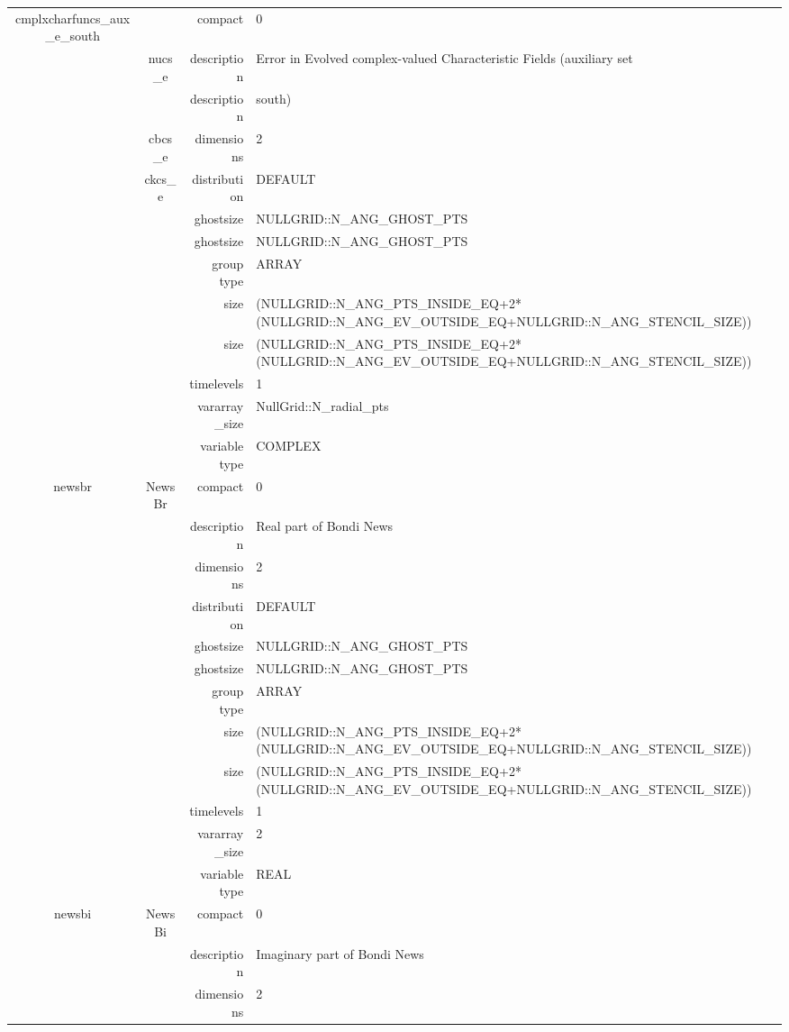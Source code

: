\begin{tabular*}{150mm}{|c|c@{\extracolsep{\fill}}|rl|}
\hline 
cmplxcharfuncs\_aux\_e\_south &  & compact & 0 \\ 
 & nucs\_e & description & Error in Evolved complex-valued Characteristic Fields (auxiliary set \\ 
& ~ & description &  south) \\ 
 & cbcs\_e & dimensions & 2 \\ 
 & ckcs\_e & distribution & DEFAULT \\ 
 &  & ghostsize & NULLGRID::N\_ANG\_GHOST\_PTS \\ 
& ~ & ghostsize & NULLGRID::N\_ANG\_GHOST\_PTS \\ 
 &  & group type & ARRAY \\ 
 &  & size & (NULLGRID::N\_ANG\_PTS\_INSIDE\_EQ+2*(NULLGRID::N\_ANG\_EV\_OUTSIDE\_EQ+NULLGRID::N\_ANG\_STENCIL\_SIZE)) \\ 
& ~ & size & (NULLGRID::N\_ANG\_PTS\_INSIDE\_EQ+2*(NULLGRID::N\_ANG\_EV\_OUTSIDE\_EQ+NULLGRID::N\_ANG\_STENCIL\_SIZE)) \\ 
 &  & timelevels & 1 \\ 
 &  & vararray\_size & NullGrid::N\_radial\_pts \\ 
 &  & variable type & COMPLEX \\ 
\hline 
newsbr & NewsBr & compact & 0 \\ 
 &  & description & Real part of Bondi News \\ 
 &  & dimensions & 2 \\ 
 &  & distribution & DEFAULT \\ 
 &  & ghostsize & NULLGRID::N\_ANG\_GHOST\_PTS \\ 
& ~ & ghostsize & NULLGRID::N\_ANG\_GHOST\_PTS \\ 
 &  & group type & ARRAY \\ 
 &  & size & (NULLGRID::N\_ANG\_PTS\_INSIDE\_EQ+2*(NULLGRID::N\_ANG\_EV\_OUTSIDE\_EQ+NULLGRID::N\_ANG\_STENCIL\_SIZE)) \\ 
& ~ & size & (NULLGRID::N\_ANG\_PTS\_INSIDE\_EQ+2*(NULLGRID::N\_ANG\_EV\_OUTSIDE\_EQ+NULLGRID::N\_ANG\_STENCIL\_SIZE)) \\ 
 &  & timelevels & 1 \\ 
 &  & vararray\_size & 2 \\ 
 &  & variable type & REAL \\ 
\hline 
newsbi & NewsBi & compact & 0 \\ 
 &  & description & Imaginary part of Bondi News \\ 
 &  & dimensions & 2 \\ 

\end{tabular*}
